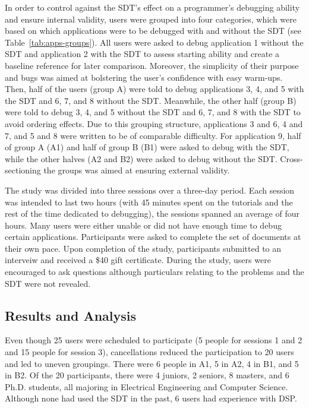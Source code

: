 \documentclass[11pt, letterpaper, onecolumn]{article}
\begin{document}
In  order  to control  against  the  SDT's  effect on  a  programmer's
debugging  ability and  ensure internal  validity, users  were grouped
into four categories,  which were based on which  applications were to
be     debugged     with      and     without     the     SDT     (see
Table~\ref{tab:apps-groups}).   All   users   were  asked   to   debug
application 1 without the SDT and application 2 with the SDT to assess
starting ability and create a baseline reference for later comparison.
Moreover,  the simplicity  of  their  purpose and  bugs  was aimed  at
bolstering the  user's confidence with  easy warm-ups.  Then,  half of
the users (group  A) were told to debug applications 3,  4, and 5 with
the SDT  and 6, 7,  and 8 without  the SDT. Meanwhile, the  other half
(group B) were told to debug 3, 4, and 5 without the SDT and 6, 7, and
8  with  the SDT  to  avoid ordering  effects.  Due  to this  grouping
structure, applications 3 and 6, 4 and  7, and 5 and 8 were written to
be of comparable difficulty.  For  application 9, half of group A (A1)
and half of group  B (B1) were asked to debug with  the SDT, while the
other  halves   (A2  and   B2)  were  asked   to  debug   without  the
SDT.  Cross-sectioning  the  groups  was aimed  at  ensuring  external
validity.

The study  was divided  into three sessions  over a  three-day period.
Each session was intended to last  two hours (with 45 minutes spent on
the tutorials  and the rest of  the time dedicated  to debugging), the
sessions  spanned an  average of  four hours.  Many users  were either
unable  or did  not have  enough time  to debug  certain applications.
Participants were asked to complete  the set of documents at their own
pace.   Upon completion  of the  study, participants  submitted  to an
interveiw  and received  a \$40  gift certificate.  During  the study,
users were  encouraged to ask questions  although particulars relating
to the problems and the SDT were not revealed.


\subsection{Results and Analysis}

Even  though 25  users were  scheduled  to participate  (5 people  for
sessions 1 and  2 and 15 people for  session 3), cancellations reduced
the participation to 20 users  and led to uneven groupings. There were
6 people in A1, 5 in A2, 4 in B1, and 5 in B2. Of the 20 participants,
there were 4 juniors, 2 seniors,  8 masters, and 6 Ph.D. students, all
majoring in Electrical Engineering and Computer Science. Although none
had used the SDT in the past, 6 users had experience with DSP.
\end{document}
